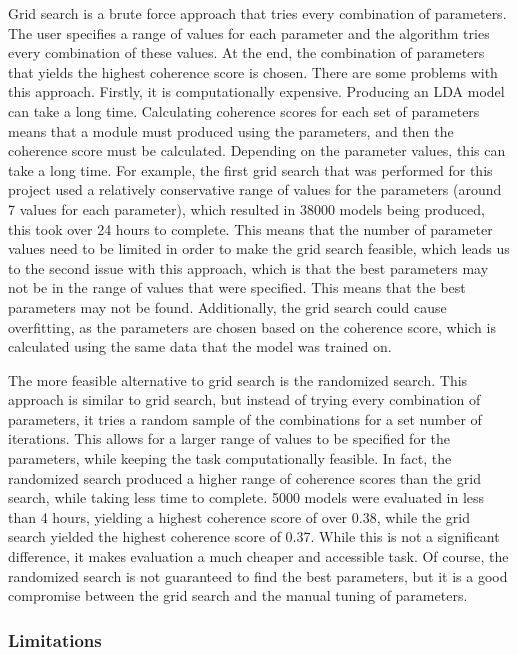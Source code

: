 Grid search is a brute force approach that tries every combination of parameters. The user specifies a range of values for each parameter and the algorithm tries every combination of these values. At the end, the combination of parameters that yields the highest coherence score is chosen. There are some problems with this approach. Firstly, it is computationally expensive. Producing an LDA model can take a long time. Calculating coherence scores for each set of parameters means that a module must produced using the parameters, and then the coherence score must be calculated. Depending on the parameter values, this can take a long time. For example, the first grid search that was performed for this project used a relatively conservative range of values for the parameters (around 7 values for each parameter), which resulted in 38000 models being produced, this took over 24 hours to complete. This means that the number of parameter values need to be limited in order to make the grid search feasible, which leads us to the second issue with this approach, which is that the best parameters may not be in the range of values that were specified. This means that the best parameters may not be found. Additionally, the grid search could cause overfitting, as the parameters are chosen based on the coherence score, which is calculated using the same data that the model was trained on.

The more feasible alternative to grid search is the randomized search. This approach is similar to grid search, but instead of trying every combination of parameters, it tries a random sample of the combinations for a set number of iterations. This allows for a larger range of values to be specified for the parameters, while keeping the task computationally feasible. In fact, the randomized search produced a higher range of coherence scores than the grid search, while taking less time to complete. 5000 models were evaluated in less than 4 hours, yielding a highest coherence score of over 0.38, while the grid search yielded the highest coherence score of 0.37. While this is not a significant difference, it makes evaluation a much cheaper and accessible task. Of course, the randomized search is not guaranteed to find the best parameters, but it is a good compromise between the grid search and the manual tuning of parameters.

\subsubsection{Limitations}

